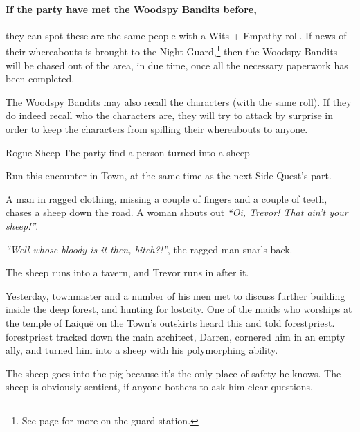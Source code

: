 \begin{multicols}{2}
\label{traitor}
\traitor


\basilisk

\paragraph{If the party have met the Woodspy Bandits before,}
they can spot these are the same people with a Wits + Empathy roll.
If news of their whereabouts is brought to the Night Guard,\footnote{See page \pageref{guardstation} for more on the guard station.}
then the Woodspy Bandits will be chased out of the area, in due time, once all the necessary paperwork has been completed.

The Woodspy Bandits may also recall the characters (with the same roll).
If they do indeed recall who the characters are, they will try to attack by surprise in order to keep the characters from spilling their whereabouts to anyone.

{Rogue Sheep}%
{The party find a person turned into a sheep}%

Run this encounter in Town, at the same time as the next Side Quest's part.

\begin{boxtext}

	A man in ragged clothing, missing a couple of fingers and a couple of teeth, chases a sheep down the road.  A woman shouts out \emph{``Oi, Trevor! That ain't your sheep!''}.

	\emph{``Well whose bloody is it then, bitch?!''}, the ragged man snarls back.

	The sheep runs into a tavern, and Trevor runs in after it.

\end{boxtext}

Yesterday, \gls{townmaster} and a number of his men met to discuss further building inside the deep forest, and hunting for \gls{lostcity}.
One of the maids who worships at the temple of Laiqu\"{e} on the Town's outskirts heard this and told \gls{forestpriest}.
\Gls{forestpriest} tracked down the main architect, Darren, cornered him in an empty ally, and turned him into a sheep with his polymorphing ability.

The sheep goes into the \gls{pig} because it's the only place of safety he knows.  The sheep is obviously sentient, if anyone bothers to ask him clear questions.


\end{multicols}
